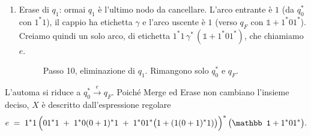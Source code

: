 \begin{exam}
\begin{enumerate}[label=Passo \arabic*.,leftmargin=*,itemsep=1em]
\item Erase di $q_1$: ormai $q_1$ è l'ultimo nodo da cancellare. L'arco entrante è $1$ (da $q_0^*$ con $1^*1$), il cappio ha etichetta $\gamma$ e l'arco uscente è $1$ (verso $q_F$ con $\mathbb 1+1^*01^*$). Creiamo quindi un solo arco, di etichetta $1^*1\,\gamma^*\,(\mathbb 1+1^*01^*)$, che chiamiamo $e$.
 
\begin{figure}[H]
\centering
{}
\caption{Passo 10, eliminazione di $q_1$. Rimangono solo $q_0^*$ e $q_F$.}
\label{fig:regex-10}
\end{figure}
 
\end{enumerate}
 
\medskip
\noindent L'automa si riduce a $q_0^* \xrightarrow{\,e\,} q_F$. Poiché Merge ed Erase non cambiano l'insieme deciso, $X$ è descritto dall'espressione regolare
\[
e \;=\; 1^*1\,\Bigl(01^*1\;+\;1^*0(0+1)^*1\;+\;1^*01^*\bigl(1+(1(0+1)^*1)\bigr)\Bigr)^{*}\,\bigl(\mathbb 1+1^*01^*\bigr).
\]
\end{exam}
